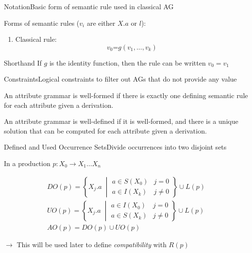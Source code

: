 \begin{frame}{Notation}{Basic form of semantic rule used in classical AG}

Forms of semantic rules ($v_i$ are either $X.a$ or $l$):

\begin{enumerate}
    \item Classical rule: $$v_0 \texttt{=} g(v_1, \dots, v_k) $$
\end{enumerate}

\newlinevspace 
\newlinevspace 

\begin{block}{Shorthand}
If $g$ is the \alert{identity function}, then the rule can be written \alert{$v_0 = v_1$}
\end{block}
    
\end{frame}



\begin{frame}{Constraints}{Logical constraints to filter out AGs that do not provide any value}

\begin{definition}
An attribute grammar is \alert{well-formed} if there is exactly one defining semantic rule for each attribute given a derivation.
\end{definition}

\begin{definition}
An attribute grammar is \alert{well-defined} if it is \alert{well-formed}, and there is a unique solution that can be computed for each attribute given a derivation.
\end{definition}
\end{frame}




\begin{frame}{Defined and Used Occurrence Sets}{Divide occurrences into two disjoint sets}

In a production $p: X_0 \rightarrow X_1 \dots X_n$

\begin{equation}
\begin{gathered}
  \mathit{DO}(p) = \left \{ X_j.a \; \middle\vert
    \begin{array}{cc}
     a \in S(X_0) & j = 0 \\
     a \in I(X_k) & j \neq 0
    \end{array}
\right \} \cup L(p) \\
\mathit{UO}(p) = \left \{ X_j.a \; \middle\vert
    \begin{array}{cc}
     a \in I(X_0) & j = 0 \\
     a \in S(X_k) & j \neq 0
    \end{array}
\right \} \cup L(p) \\
\mathit{AO}(p) = \mathit{DO}(p) \cup \mathit{UO}(p)
\end{gathered} 
\end{equation}

\newlinevspace

$\to$ This will be used later to define \emph{compatibility} with $R(p)$

\end{frame}

